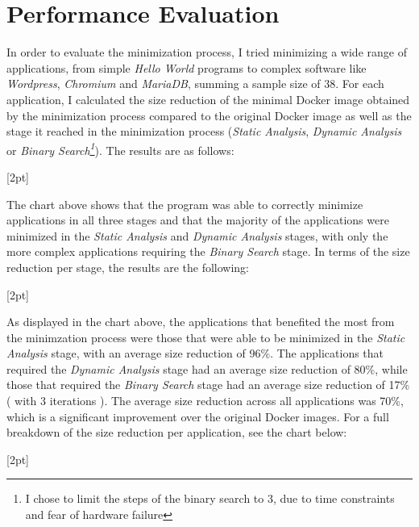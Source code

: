 \chapter{Performance Evaluation}
\label{chapter:performance-evaluation}

In order to evaluate the minimization process, I tried minimizing a wide range of applications, from simple \textit{Hello World} programs to complex 
software like \textit{Wordpress}, \textit{Chromium} and \textit{MariaDB}, summing a sample size of 
38. For each application, I calculated the size reduction of the minimal Docker image obtained by the minimization process compared to the 
original Docker image as well as the stage it reached in the minimization process (\textit{Static Analysis}, \textit{Dynamic Analysis} or \textit{Binary Search\footnote{I chose to limit the steps of the binary search to 3, due to time constraints and fear of hardware failure }}).
The results are as follows:

[2pt]

The chart above shows that the program was able to correctly minimize applications in all three stages and that the majority of the applications were minimized in the 
\textit{Static Analysis} and \textit{Dynamic Analysis} stages, with only the more complex applications requiring the \textit{Binary Search} stage.
\pagebreak
In terms of the size reduction per stage, the results are the following:

[2pt]

As displayed in the chart above, the applications that benefited the most from the minimzation process were those that were able to be minimized in the \textit{Static Analysis} stage, with an average size reduction of 96\%. The applications that required the \textit{Dynamic Analysis} stage had an average size reduction of 80\%, while those that required the \textit{Binary Search} stage had an average size reduction of 17\% ( with 3 iterations ).
The average size reduction across all applications was 70\%, which is a significant improvement over the original Docker images.
For a full breakdown of the size reduction per application, see the chart below: 

[2pt]

